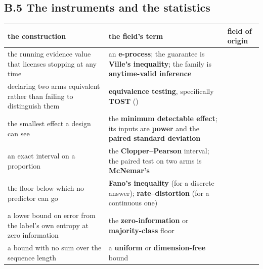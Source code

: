 \documentclass[11pt,a4paper]{article}
\newcounter{none}                 %
\theoremstyle{plain}
\theoremstyle{definition}
\theoremstyle{remark}
\begin{document}
\subsection{B.5 The instruments and the
statistics}\label{b.5-the-instruments-and-the-statistics}

{\def\LTcaptype{none} %
\begin{longtable}[]{@{}
  >{\raggedright\arraybackslash}p{}
  >{\raggedright\arraybackslash}p{}
  >{\raggedright\arraybackslash}p{}@{}}
\toprule\noalign{}
\begin{minipage}[b]{\linewidth}\raggedright
the construction
\end{minipage} & \begin{minipage}[b]{\linewidth}\raggedright
the field's term
\end{minipage} & \begin{minipage}[b]{\linewidth}\raggedright
field of origin
\end{minipage} \\
\midrule\noalign{}
\endhead
\bottomrule\noalign{}
\endlastfoot
the running evidence value that licenses stopping at any time & an
\textbf{e-process}; the guarantee is \textbf{Ville's inequality}; the
family is \textbf{anytime-valid inference} & \\
declaring two arms equivalent rather than failing to distinguish them &
\textbf{equivalence testing}, specifically \textbf{TOST}
(\citep{schuirmann-1987-tost}) & \\
the smallest effect a design can see & the \textbf{minimum detectable
effect}; its inputs are \textbf{power} and the \textbf{paired standard
deviation} & \\
an exact interval on a proportion & the \textbf{Clopper--Pearson}
interval; the paired test on two arms is \textbf{McNemar's} & \\
the floor below which no predictor can go & \textbf{Fano's inequality}
(for a discrete answer); \textbf{rate--distortion} (for a continuous
one) & \\
a lower bound on error from the label's own entropy at zero information
& the \textbf{zero-information} or \textbf{majority-class} floor & \\
a bound with no sum over the sequence length & a \textbf{uniform} or
\textbf{dimension-free} bound & \\
\end{longtable}
}
\end{document}
